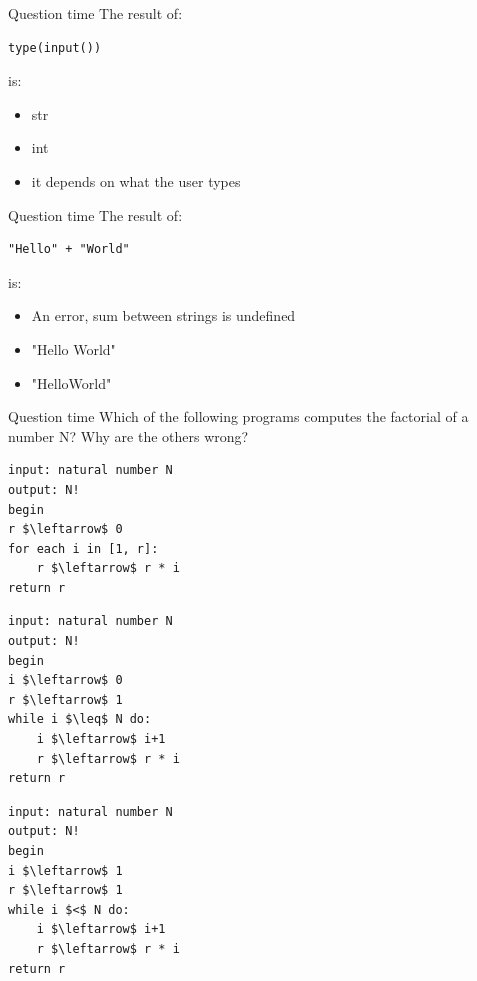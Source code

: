 \documentclass[aspectratio=169,]{beamer}
\begin{document}
\begin{frame}[fragile]{Question time}
    The result of:
    \begin{verbatim}
type(input())
    \end{verbatim}
    is: \begin{itemize}
        \item str
        \item int
        \item it depends on what the user types
    \end{itemize}
\end{frame}

\begin{frame}[fragile]{Question time}
    The result of:
    \begin{verbatim}
"Hello" + "World"
    \end{verbatim}
    is: \begin{itemize}
        \item An error, sum between strings is undefined
        \item "Hello World"
        \item "HelloWorld"
    \end{itemize}
\end{frame}

\begin{frame}[fragile]{Question time}
    Which of the following programs computes the factorial of a number N?
    Why are the others wrong?

    \begin{minipage}{0.32\textwidth}
        \begin{lstlisting}[style=pseudo]
input: natural number N
output: N!
begin
r $\leftarrow$ 0
for each i in [1, r]:
    r $\leftarrow$ r * i
return r
            \end{lstlisting}
    \end{minipage}
    \begin{minipage}{0.32\textwidth}
        \begin{lstlisting}[style=pseudo]
input: natural number N
output: N!
begin
i $\leftarrow$ 0
r $\leftarrow$ 1
while i $\leq$ N do:
    i $\leftarrow$ i+1
    r $\leftarrow$ r * i
return r
            \end{lstlisting}
    \end{minipage}
    \begin{minipage}{0.25\textwidth}
        \begin{lstlisting}[style=pseudo]
input: natural number N
output: N!
begin
i $\leftarrow$ 1
r $\leftarrow$ 1
while i $<$ N do:
    i $\leftarrow$ i+1
    r $\leftarrow$ r * i
return r
            \end{lstlisting}
    \end{minipage}
\end{frame}
\end{document}
